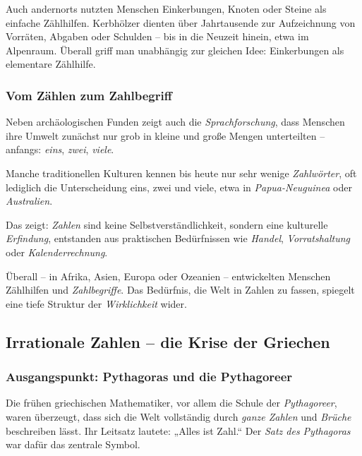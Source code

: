 Auch andernorts nutzten Menschen Einkerbungen, Knoten oder Steine als einfache Zählhilfen. 
Kerbhölzer dienten über Jahrtausende zur Aufzeichnung von Vorräten, Abgaben oder Schulden – 
bis in die Neuzeit hinein, etwa im Alpenraum. 
Überall griff man unabhängig zur gleichen Idee: 
Einkerbungen als elementare Zählhilfe.

\subsubsection*{Vom Zählen zum Zahlbegriff}
Neben archäologischen Funden zeigt auch die \emph{Sprachforschung}, 
dass Menschen ihre Umwelt zunächst nur grob in kleine und große Mengen unterteilten – 
anfangs: \emph{eins}, \emph{zwei}, \emph{viele}. 

Manche traditionellen Kulturen kennen bis heute nur sehr wenige \emph{Zahlwörter}, 
oft lediglich die Unterscheidung \glqq eins\grqq, \glqq zwei\grqq{} und \glqq viele\grqq, 
etwa in \emph{Papua-Neuguinea} oder \emph{Australien}. 

Das zeigt: \emph{Zahlen} sind keine Selbstverständlichkeit, 
sondern eine kulturelle \emph{Erfindung}, entstanden aus praktischen Bedürfnissen 
wie \emph{Handel}, \emph{Vorratshaltung} 
oder \emph{Kalenderrechnung}. 

Überall – in Afrika, Asien, Europa oder Ozeanien – entwickelten Menschen Zählhilfen 
und \emph{Zahlbegriffe}. 
Das Bedürfnis, die Welt in Zahlen zu fassen, spiegelt eine tiefe Struktur der 
\emph{Wirklichkeit} wider.




\subsection{Irrationale Zahlen – die Krise der Griechen}
\label{sec:2.2_irrat}

\subsubsection*{Ausgangspunkt: Pythagoras und die Pythagoreer}
Die frühen griechischen Mathematiker, vor allem die Schule der 
\emph{Pythagoreer}, waren überzeugt, dass sich die Welt vollständig 
durch \emph{ganze Zahlen} und \emph{Brüche} beschreiben lässt. 
Ihr Leitsatz lautete: „Alles ist Zahl.“ 
Der \emph{Satz des Pythagoras} war dafür das zentrale Symbol.

